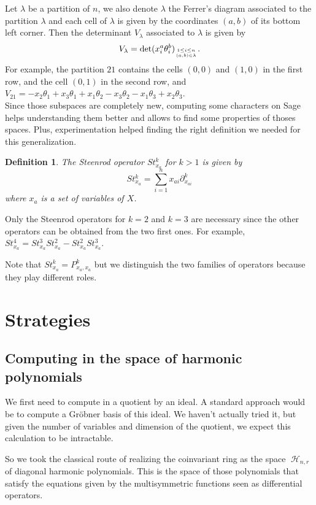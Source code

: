 \documentclass[letter,12pt]{article}
\newcommand{\pauline}[1]{\todo[linecolor=blue,backgroundcolor=blue!25,bordercolor=blue]{#1}}
\DeclareMathOperator{\harmonics}{\mathcal{H}}
\newtheorem{definition}{Definition}
\begin{document}
	Let $\lambda$ be a partition of $n$, we also denote $\lambda$ the Ferrer's diagram associated to the partition $\lambda$ and each cell of $\lambda$ is given by the coordinates $(a,b)$ of its bottom left corner. Then the determinant $V_{\lambda}$ associated to $\lambda$ is given by $$V_{\lambda} = \det (x_i^a \theta_i^b)_{1 \leq i \leq n \atop (a,b) \in \lambda} .$$
	For example, the partition $21$ contains the cells $(0,0)$ and $(1,0)$ in the first row, and the cell $(0,1)$ in the second row, and $V_{21} = -x_2\theta_1 + x_3\theta_1 + x_1\theta_2 - x_3\theta_2 - x_1\theta_3 + x_2\theta_3$. \\
	
	Since those subspaces are completely new, computing some characters on Sage helps understanding them better and allows to find some properties of thoses spaces. 
	Plus, experimentation helped finding the right definition we needed for this generalization.
	
	\begin{definition} \pauline{find the right place for Steenrod op}
		The \emph{Steenrod operator} $St_{x_a}^k$ for $k>1$ is given by
		$$St_{x_a}^k = \sum_{i=1}^{n} x_{ai} \partial_{x_{ai}}^k$$
		where $x_a$ is a set of variables of $X$. 
	\end{definition}


	Only the Steenrod operators for $k=2$ and $k=3$ are necessary since the other operators can be obtained from the two first ones. For example, $St_{x_a}^4 = St_{x_a}^3St_{x_a}^2 - St_{x_a}^2St_{x_a}^3$. 

	Note that $St_{x_a}^k = P_{x_a,x_a}^k$ but we distinguish the two families of operators because they play different roles. 
	
	\section{Strategies}
	
	\subsection{Computing in the space of harmonic polynomials}
	
	We first need to compute in a quotient by an ideal.
	A standard approach would be to compute a Gröbner basis of this ideal.
	We haven't actually tried it, but given the number of variables and dimension of the quotient, we expect this calculation to be intractable.
	
	So we took the classical route of realizing the coinvariant ring as the space $\harmonics_{n,r}$ of diagonal harmonic polynomials.
	This is the space of those polynomials that satisfy the equations given by the multisymmetric functions seen as differential operators.
	
\end{document}
